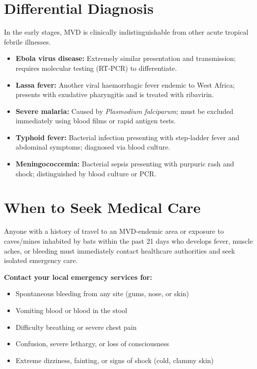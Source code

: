 \section*{Differential Diagnosis}
In the early stages, MVD is clinically indistinguishable from other acute tropical febrile illnesses.
\begin{itemize}
    \item \textbf{Ebola virus disease:} Extremely similar presentation and transmission; requires molecular testing (RT-PCR) to differentiate.
    \item \textbf{Lassa fever:} Another viral haemorrhagic fever endemic to West Africa; presents with exudative pharyngitis and is treated with ribavirin.
    \item \textbf{Severe malaria:} Caused by \textit{Plasmodium falciparum}; must be excluded immediately using blood films or rapid antigen tests.
    \item \textbf{Typhoid fever:} Bacterial infection presenting with step-ladder fever and abdominal symptoms; diagnosed via blood culture.
    \item \textbf{Meningococcemia:} Bacterial sepsis presenting with purpuric rash and shock; distinguished by blood culture or PCR.
\end{itemize}

\section*{When to Seek Medical Care}
Anyone with a history of travel to an MVD-endemic area or exposure to caves/mines inhabited by bats within the past 21 days who develops fever, muscle aches, or bleeding must immediately contact healthcare authorities and seek isolated emergency care.

\textbf{Contact your local emergency services for:}
\begin{itemize}
    \item Spontaneous bleeding from any site (gums, nose, or skin)
    \item Vomiting blood or blood in the stool
    \item Difficulty breathing or severe chest pain
    \item Confusion, severe lethargy, or loss of consciousness
    \item Extreme dizziness, fainting, or signs of shock (cold, clammy skin)
\end{itemize}

